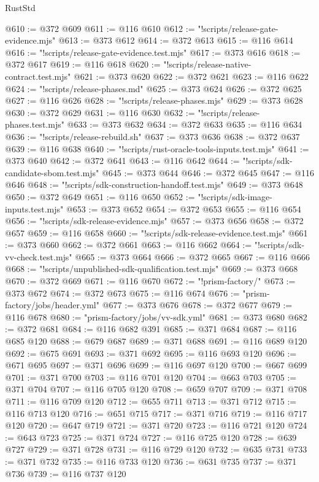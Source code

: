 \begin{lexlean}{RustStd}
\begin{coremodule}
@610 := @372 @609
@611 := @116 @610
@612 := "!scripts/release-gate-evidence.mjs"
@613 := @373 @612
@614 := @372 @613
@615 := @116 @614
@616 := "!scripts/release-gate-evidence.test.mjs"
@617 := @373 @616
@618 := @372 @617
@619 := @116 @618
@620 := "!scripts/release-native-contract.test.mjs"
@621 := @373 @620
@622 := @372 @621
@623 := @116 @622
@624 := "!scripts/release-phases.md"
@625 := @373 @624
@626 := @372 @625
@627 := @116 @626
@628 := "!scripts/release-phases.mjs"
@629 := @373 @628
@630 := @372 @629
@631 := @116 @630
@632 := "!scripts/release-phases.test.mjs"
@633 := @373 @632
@634 := @372 @633
@635 := @116 @634
@636 := "!scripts/release-rebuild.sh"
@637 := @373 @636
@638 := @372 @637
@639 := @116 @638
@640 := "!scripts/rust-oracle-tools-inputs.test.mjs"
@641 := @373 @640
@642 := @372 @641
@643 := @116 @642
@644 := "!scripts/sdk-candidate-sbom.test.mjs"
@645 := @373 @644
@646 := @372 @645
@647 := @116 @646
@648 := "!scripts/sdk-construction-handoff.test.mjs"
@649 := @373 @648
@650 := @372 @649
@651 := @116 @650
@652 := "!scripts/sdk-image-inputs.test.mjs"
@653 := @373 @652
@654 := @372 @653
@655 := @116 @654
@656 := "!scripts/sdk-release-evidence.mjs"
@657 := @373 @656
@658 := @372 @657
@659 := @116 @658
@660 := "!scripts/sdk-release-evidence.test.mjs"
@661 := @373 @660
@662 := @372 @661
@663 := @116 @662
@664 := "!scripts/sdk-vv-check.test.mjs"
@665 := @373 @664
@666 := @372 @665
@667 := @116 @666
@668 := "!scripts/unpublished-sdk-qualification.test.mjs"
@669 := @373 @668
@670 := @372 @669
@671 := @116 @670
@672 := "!prism-factory/"
@673 := @373 @672
@674 := @372 @673
@675 := @116 @674
@676 := "prism-factory/jobs/header.yml"
@677 := @373 @676
@678 := @372 @677
@679 := @116 @678
@680 := "prism-factory/jobs/vv-sdk.yml"
@681 := @373 @680
@682 := @372 @681
@684 := @116 @682 @391
@685 := @371 @684
@687 := @116 @685 @120
@688 := @679 @687
@689 := @371 @688
@691 := @116 @689 @120
@692 := @675 @691
@693 := @371 @692
@695 := @116 @693 @120
@696 := @671 @695
@697 := @371 @696
@699 := @116 @697 @120
@700 := @667 @699
@701 := @371 @700
@703 := @116 @701 @120
@704 := @663 @703
@705 := @371 @704
@707 := @116 @705 @120
@708 := @659 @707
@709 := @371 @708
@711 := @116 @709 @120
@712 := @655 @711
@713 := @371 @712
@715 := @116 @713 @120
@716 := @651 @715
@717 := @371 @716
@719 := @116 @717 @120
@720 := @647 @719
@721 := @371 @720
@723 := @116 @721 @120
@724 := @643 @723
@725 := @371 @724
@727 := @116 @725 @120
@728 := @639 @727
@729 := @371 @728
@731 := @116 @729 @120
@732 := @635 @731
@733 := @371 @732
@735 := @116 @733 @120
@736 := @631 @735
@737 := @371 @736
@739 := @116 @737 @120

\end{coremodule}
\end{lexlean}
